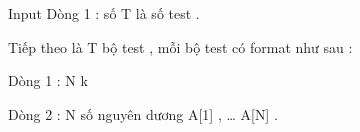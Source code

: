 Input
Dòng 1 : số T là số test .   


   Tiếp theo là T bộ test , mỗi bộ test có format như sau :   


   Dòng 1 : N k   


   Dòng 2 : N số nguyên dương A[1] , … A[N] .